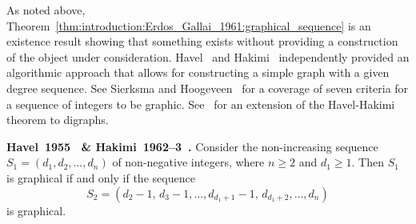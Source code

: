 As noted above,
Theorem~\ref{thm:introduction:Erdos_Gallai_1961:graphical_sequence} is
an existence result showing that something exists without providing a
construction of the object under consideration. Havel~\cite{Havel1955}
and Hakimi~\cite{Hakimi1962,Hakimi1963} independently provided an
algorithmic approach that allows for constructing a simple graph with
a given degree sequence. See Sierksma and
Hoogeveen~\cite{SierksmaHoogeveen1991} for a coverage of seven
criteria for a sequence of integers to be graphic.
See~\cite{ErdosEtAl2010} for an extension of the Havel-Hakimi theorem
to digraphs.

\begin{theorem}
\label{thm:introduction:Havel1955_Hakimi1962:graphical_sequence}
\textbf{Havel~1955~\cite{Havel1955} \&
  Hakimi~1962--3~\cite{Hakimi1962,Hakimi1963}.}
Consider the non-increasing sequence $S_1 = (d_1, d_2, \dots, d_n)$ of
non-negative integers, where $n \geq 2$ and $d_1 \geq 1$. Then $S_1$ is
graphical if and only if the sequence
\[
S_2
=
(d_2 - 1,\, d_3 - 1, \dots, d_{d_1 + 1} - 1,\, d_{d_1 + 2}, \dots, d_n)
\]
is graphical.
\end{theorem}

